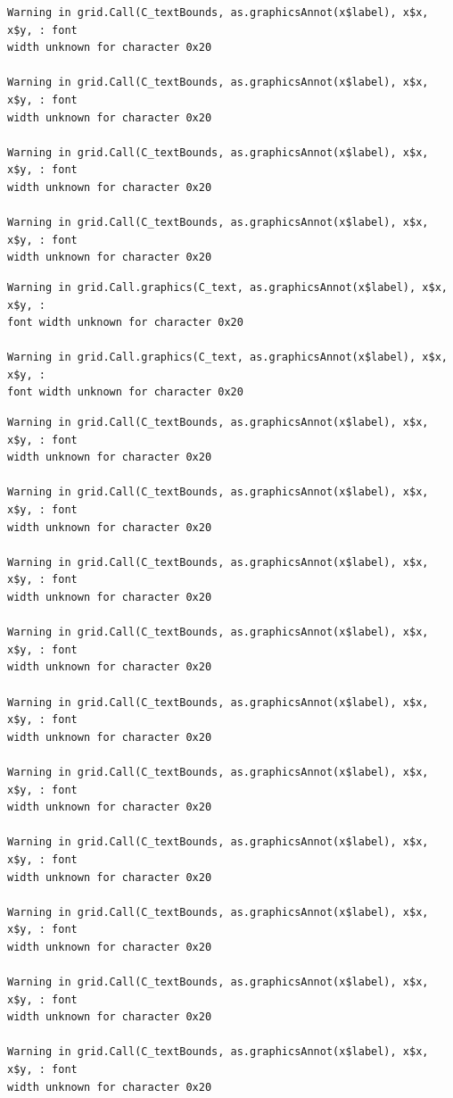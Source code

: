 \documentclass[
  letterpaper,
  DIV=11,
  numbers=noendperiod,
  oneside]{scrartcl}
\begin{document}
\begin{verbatim}
Warning in grid.Call(C_textBounds, as.graphicsAnnot(x$label), x$x, x$y, : font
width unknown for character 0x20

Warning in grid.Call(C_textBounds, as.graphicsAnnot(x$label), x$x, x$y, : font
width unknown for character 0x20

Warning in grid.Call(C_textBounds, as.graphicsAnnot(x$label), x$x, x$y, : font
width unknown for character 0x20

Warning in grid.Call(C_textBounds, as.graphicsAnnot(x$label), x$x, x$y, : font
width unknown for character 0x20
\end{verbatim}

\begin{verbatim}
Warning in grid.Call.graphics(C_text, as.graphicsAnnot(x$label), x$x, x$y, :
font width unknown for character 0x20

Warning in grid.Call.graphics(C_text, as.graphicsAnnot(x$label), x$x, x$y, :
font width unknown for character 0x20
\end{verbatim}

\begin{verbatim}
Warning in grid.Call(C_textBounds, as.graphicsAnnot(x$label), x$x, x$y, : font
width unknown for character 0x20

Warning in grid.Call(C_textBounds, as.graphicsAnnot(x$label), x$x, x$y, : font
width unknown for character 0x20

Warning in grid.Call(C_textBounds, as.graphicsAnnot(x$label), x$x, x$y, : font
width unknown for character 0x20

Warning in grid.Call(C_textBounds, as.graphicsAnnot(x$label), x$x, x$y, : font
width unknown for character 0x20

Warning in grid.Call(C_textBounds, as.graphicsAnnot(x$label), x$x, x$y, : font
width unknown for character 0x20

Warning in grid.Call(C_textBounds, as.graphicsAnnot(x$label), x$x, x$y, : font
width unknown for character 0x20

Warning in grid.Call(C_textBounds, as.graphicsAnnot(x$label), x$x, x$y, : font
width unknown for character 0x20

Warning in grid.Call(C_textBounds, as.graphicsAnnot(x$label), x$x, x$y, : font
width unknown for character 0x20

Warning in grid.Call(C_textBounds, as.graphicsAnnot(x$label), x$x, x$y, : font
width unknown for character 0x20

Warning in grid.Call(C_textBounds, as.graphicsAnnot(x$label), x$x, x$y, : font
width unknown for character 0x20
\end{verbatim}
\end{document}
